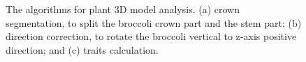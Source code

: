 \begin{figure}[htb]
  \begin{center}
  \end{center}
  \caption[The algorithms for plant 3D model analysis]{
    The algorithms for plant 3D model analysis. (a) crown segmentation, to split the broccoli crown part and the stem part; (b) direction correction, to rotate the broccoli vertical to z-axis positive direction; and (c) traits calculation.
  }
  \label{fig:des3}
\end{figure}